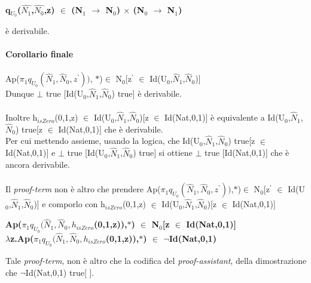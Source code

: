 \normalsize
\begin{center}\textbf{q$_{U_0}$($\hat{N_1}$,$\hat{N_0}$,z) $\in$ (N$_1$ $\rightarrow$ N$_0$) $\times$ (N$_0$ $\rightarrow$ N$_1$)}\end{center} \`e derivabile.
\\\\
\noindent
\textbf{Corollario finale}\\\\
\noindent
Ap($\pi_1 q_{U_0}(\hat{N}_1,\hat{N}_0,z^\backprime))$, $\ast$)$\in$ N$_0$[z$^\backprime$ $\in$ Id(U$_0$,$\hat{N}_1$,$\hat{N}_0$)]\\
Dunque $\bot$ true [Id(U$_0$,$\hat{N}_1$,$\hat{N}_0$) true] \`e derivabile.\\\\
\noindent
Inoltre h$_{isZero}$(0,1,z) $\in$ Id(U$_0$,$\hat{N}_1$,$\hat{N}_0$)[z $\in$ Id(Nat,0,1)] \`e equivalente a Id(U$_0$,$\hat{N}_1$,$\hat{N}_0$) true[z $\in$ Id(Nat,0,1)] che  \`e derivabile.\\
Per cui mettendo assieme, usando la logica, che Id(U$_0$,$\hat{N}_1$,$\hat{N}_0$) true[z $\in$ Id(Nat,0,1)]  e $\bot$ true [Id(U$_0$,$\hat{N}_1$,$\hat{N}_0$) true] si ottiene $\bot$ true [Id(Nat,0,1)] che \`e ancora derivabile.\\\\
\noindent 
Il \textit{proof-term} non \`e altro che prendere Ap($\pi_1 q_{U_0}(\hat{N}_1,\hat{N}_0,z^\backprime))$,$\ast$)$\in$ N$_0$[z$^\backprime$ $\in$ Id(U$_0$,$\hat{N}_1$,$\hat{N}_0$)] e comporlo con h$_{isZero}$(0,1,z) $\in$ Id(U$_0$,$\hat{N}_1$,$\hat{N}_0$)[z $\in$ Id(Nat,0,1)]
\begin{center}\textbf{Ap($\pi_1 q_{U_0}(\hat{N}_1,\hat{N}_0,h_{isZero}$(0,1,z)),$\ast$) $\in$ N$_0$[z $\in$ Id(Nat,0,1)]} \\ \textbf{$\lambda$z.Ap($\pi_1 q_{U_0}(\hat{N}_1,\hat{N}_0,h_{isZero}$(0,1,z)),$\ast$) $\in$ $\neg$Id(Nat,0,1) }\end{center}
\noindent
Tale \textit{proof-term}, non \`e altro che la codifica del \textit{proof-assistant}, della dimostrazione che $\neg$Id(Nat,0,1) true[ ].

